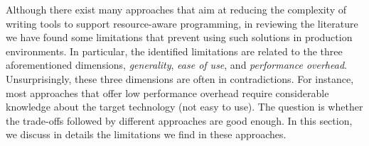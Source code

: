 Although there exist many approaches that aim at reducing the complexity of writing tools to support resource-aware programming, in reviewing the literature we have found some limitations that prevent using such solutions in production environments.
In particular, the identified limitations are related to the three aforementioned dimensions, \textit{generality}, \textit{ease of use}, and \textit{performance overhead}.
Unsurprisingly, these three dimensions are often in contradictions.
For instance, most approaches that offer low performance overhead require considerable knowledge about the target technology (not easy to use).
The question is whether the trade-offs followed by different approaches are good enough.
In this section, we discuss in details the limitations we find in these approaches.

